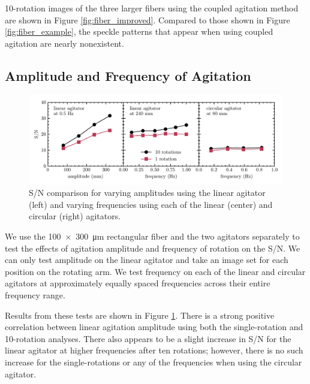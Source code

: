 10-rotation images of the three larger fibers using the coupled agitation method are shown in Figure \ref{fig:fiber_improved}. Compared to those shown in Figure \ref{fig:fiber_example}, the speckle patterns that appear when using coupled agitation are nearly nonexistent.

\subsection{Amplitude and Frequency of Agitation}
\label{subsec:amp_freq}

\begin{figure}[t]
\centering
	\includegraphics[width=\textwidth]{figures-2/amp_freq_snr.pdf}
	\caption{S/N comparison for varying amplitudes using the linear agitator (left) and varying frequencies using each of the linear (center) and circular (right) agitators.}
\label{fig:amp_freq_snr}
\end{figure}

We use the \SI{100x300}{\micro\meter} rectangular fiber and the two agitators separately to test the effects of agitation amplitude and frequency of rotation on the S/N. We can only test amplitude on the linear agitator and take an image set for each position on the rotating arm. We test frequency on each of the linear and circular agitators at approximately equally spaced frequencies across their entire frequency range.

Results from these tests are shown in Figure \ref{fig:amp_freq_snr}. There is a strong positive correlation between linear agitation amplitude using both the single-rotation and 10-rotation analyses. There also appears to be a slight increase in S/N for the linear agitator at higher frequencies after ten rotations; however, there is no such increase for the single-rotations or any of the frequencies when using the circular agitator.

